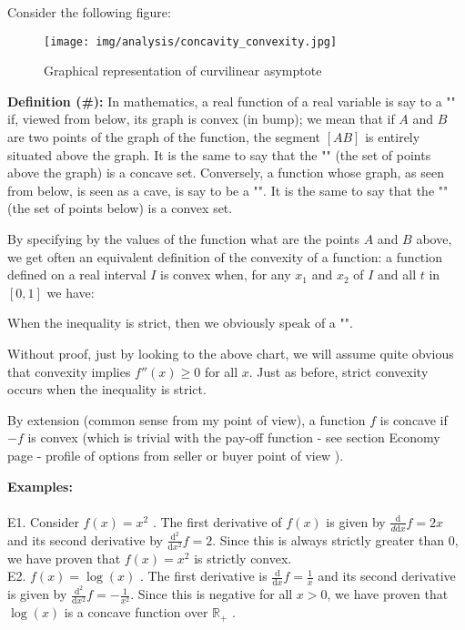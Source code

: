 	Consider the following figure:
	\begin{figure}[H]
		\centering
		\texttt{[image: img/analysis/concavity\_convexity.jpg]}
		\caption[]{Graphical representation of curvilinear asymptote}
	\end{figure}
	\textbf{Definition (\#\mydef):} In mathematics, a real function of a real variable is say to a "\label{convex function}" if, viewed from below, its graph is convex (in bump); we mean that if $A$ and $B$ are two points of the graph of the function, the segment $[AB]$ is entirely situated above the graph. It is the same to say that the "" (the set of points above the graph) is a concave set. Conversely, a function whose graph, as seen from below, is seen as a cave, is say to be a "\label{concave function}". It is the same to say that the "" (the set of points below) is a convex set.
	
	By specifying by the values of the function what are the points $A$ and $B$ above, we get often an equivalent definition of the convexity of a function: a function defined on a real interval $I$ is convex when, for any $x_1$ and $x_2$ of $I$ and all $t$ in $[0,1]$ we have:
	
	When the inequality is strict, then we obviously speak of a "".
	
	\begin{tcolorbox}[title=Remarks,colframe=black,arc=10pt]
	Without proof, just by looking to the above chart, we will assume quite obvious that convexity implies $f''(x)\geq 0$ for all $x$. Just as before, strict convexity occurs when
the inequality is strict.
	\end{tcolorbox}

	By extension (common sense from my point of view), a function $f$ is concave if $-f$ is convex (which is trivial with the pay-off function - see section Economy page \pageref{finance convex function} - profile of options from seller or buyer point of view ).
	
	\begin{tcolorbox}[colframe=black,colback=white,sharp corners]
	\textbf{{\Large {}}Examples:}\\\\
	E1. Consider $f(x)=x^{2}$ . The first derivative of $f(x)$ is given by $\frac{\mathrm{d}}{d\mathrm{d} x} f=2 x$ and its second derivative by $\frac{\mathrm{d}^{2}}{\mathrm{d} x^{2}} f=2$. Since this is  always strictly greater than $0,$ we have proven that $f(x)=x^{2}$ is strictly convex.\\
	
	E2. $f(x)=\log (x)$ . The first derivative is $\frac{\mathrm{d}}{\mathrm{d} x} f=\frac{1}{x}$ and its second derivative is given by $\frac{\mathrm{d}^{2}}{\mathrm{d} x^{2}} f=-\frac{1}{x^{2}}$. Since this is negative for all $x>0$, we have proven that $\log(x)$ is a concave function over $\mathbb{R}_{+}$ .
	\end{tcolorbox}
	
